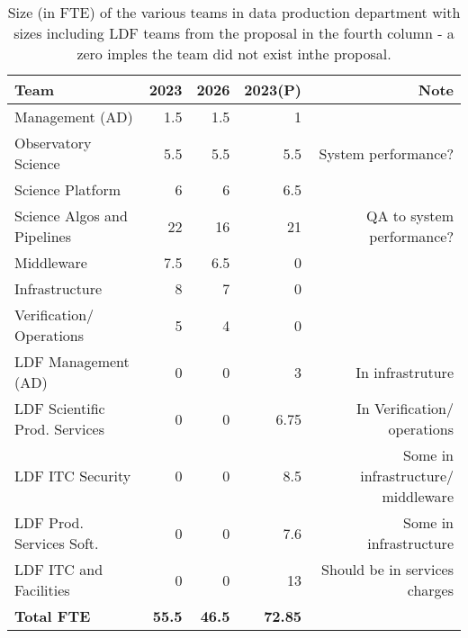  \begin{longtable} { |p{}  |r  |r  |r  |r |} 
\caption{Size (in FTE) of the various teams in data production department with sizes including \gls{LDF} teams from the proposal in the fourth column - a zero imples the team did not exist inthe proposal. \label{tab:FTE}}\\ 
\hline 
\textbf{Team}&\textbf{2023}&\textbf{2026}&\textbf{2023(P)}&\textbf{Note} \\ \hline
{Management (\gls{AD})}&{1.5}&{1.5}&{1}& \\ \hline
{Observatory Science }&{5.5}&{5.5}&{5.5}&{System performance?} \\ \hline
{Science Platform}&{6}&{6}&{6.5}& \\ \hline
{Science Algos and Pipelines}&{22}&{16}&{21}&{QA  to system performance?} \\ \hline
{Middleware}&{7.5}&{6.5}&{0}& \\ \hline
{Infrastructure}&{8}&{7}&{0}&{ } \\ \hline
{Verification/ Operations}&{5}&{4}&{0}& \\ \hline
{LDF Management (\gls{AD}) }&{0}&{0}&{3}&{In infrastruture} \\ \hline
{LDF Scientific Prod. Services}&{0}&{0}&{6.75}&{In Verification/ operations} \\ \hline
{LDF \gls{ITC} Security}&{0}&{0}&{8.5}&{Some in infrastructure/ middleware } \\ \hline
{LDF Prod. Services Soft.}&{0}&{0}&{7.6}&{Some in infrastructure} \\ \hline
{LDF \gls{ITC} and Facilities}&{0}&{0}&{13}&{Should be in services charges} \\ \hline
\textbf{Total  FTE}&\textbf{55.5}&\textbf{46.5}&\textbf{72.85}& \\ \hline
\end{longtable}
